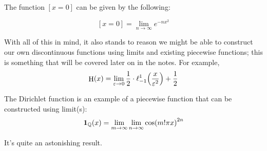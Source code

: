 \begin{theorem}
    The function $[x=0]$ can be given by the following:

    $$
        [x=0]=\lim_{n\to\infty}{e^{-nx^2}}
    $$
\end{theorem}

With all of this in mind, it also stands to reason we might be able to construct our own discontinuous functions using limits and existing piecewise functions; this is something that will be covered later on in the notes. For example,
$$
    \step{x}=\lim_{\varepsilon\to0}{\frac{1}{2}\cdot\ell_{-1}^{1}\paren*{\frac{x}{\varepsilon^2}}+\frac{1}{2}}
$$

\begin{theorem}
    The Dirichlet function is an example of a piecewise function that can be constructed using limit(s):
    $$
        \mathbf{1}_{\mathbb{Q}}(x)=\lim_{m\to\infty}{\lim_{n\to\infty}{\cos(m!\pi x)^{2n}}}
    $$

    It's quite an astonishing result.
\end{theorem}

\newpage